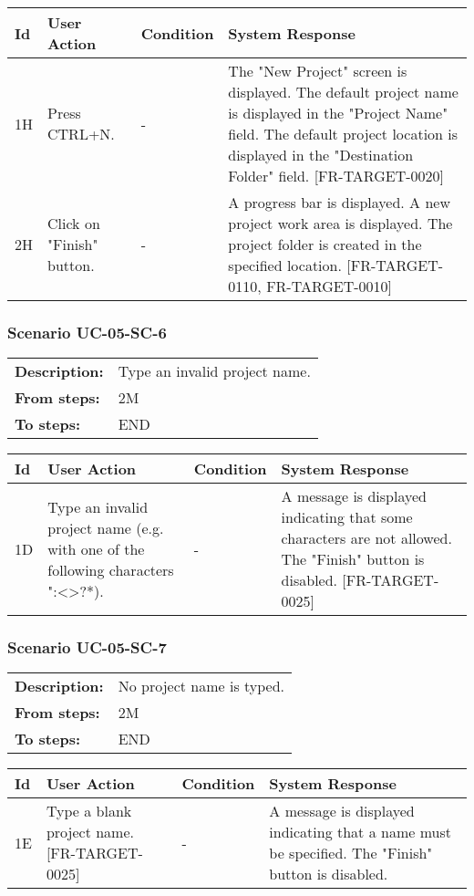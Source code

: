 \documentclass[a4paper,11pt]{article}
\newcommand{\bl}{\\ \hline}
\begin{document}
\begin{tabular}{|p{0.8in}|p{1.6in}|p{1.6in}|p{1.6in}|}
\hline
Id & User Action & Condition & System Response  \bl 
1H & Press CTRL+N. & - & The "New Project" screen is displayed. The default project name is displayed in the "Project Name" field. The default project location is displayed in the "Destination Folder" field. [FR-TARGET-0020] \bl 
2H & Click on "Finish" button. & - & A progress bar is displayed. A new project work area is displayed. The project folder is created in the specified location. [FR-TARGET-0110, FR-TARGET-0010] \bl 
\end{tabular}
\subsubsection*{Scenario UC-05-SC-6}
\begin{tabular}{p{1in}p{4in}}
{\bf Description:} & Type an invalid project name. \\
{\bf From steps:} & 2M \\
{\bf To steps:} & END \\
\end{tabular}
 
\begin{tabular}{|p{0.8in}|p{1.6in}|p{1.6in}|p{1.6in}|}
\hline
Id & User Action & Condition & System Response  \bl 
1D & Type an invalid project name (e.g. with one of the following characters ":\/<>?*). & - & A message is displayed indicating that some characters are not allowed. The "Finish" button is disabled. [FR-TARGET-0025] \bl 
\end{tabular}
\subsubsection*{Scenario UC-05-SC-7}
\begin{tabular}{p{1in}p{4in}}
{\bf Description:} & No project name is typed. \\
{\bf From steps:} & 2M \\
{\bf To steps:} & END \\
\end{tabular}
 
\begin{tabular}{|p{0.8in}|p{1.6in}|p{1.6in}|p{1.6in}|}
\hline
Id & User Action & Condition & System Response  \bl 
1E & Type a blank project name. [FR-TARGET-0025] & - & A message is displayed indicating that a name must be specified. The "Finish" button is disabled. \bl 
\end{tabular}
\end{document}
